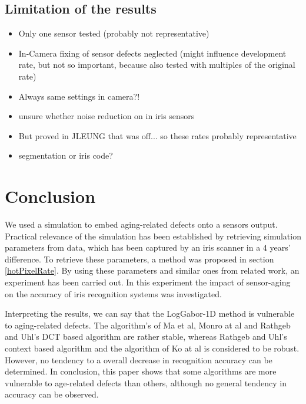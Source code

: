\documentclass[10pt,twocolumn,letterpaper]{article}
\begin{document}
 
 \subsection{Limitation of the results}
 \begin{itemize}
  \item Only one sensor tested (probably not representative)
  \item In-Camera fixing of sensor defects neglected (might influence development rate, but not so important, because also tested with multiples of the original rate)
  \item Always same settings in camera?!
  \item unsure whether noise reduction on in iris sensors
  \item But proved in JLEUNG that was off... so these rates probably representative
  \item segmentation or iris code?
 \end{itemize}
 
 
 \section{Conclusion}
 \label{conclusion}
 We used a simulation to embed aging-related defects onto a sensors output. Practical relevance of the simulation has been established by retrieving simulation parameters from data, which has been captured by an iris scanner in a 4 years' difference. To retrieve these parameters, a method was proposed in section \ref{hotPixelRate}. By using these parameters and similar ones from related work, an experiment has been carried out. In this experiment the impact of sensor-aging on the accuracy of iris recognition systems was investigated.
 
 Interpreting the results, we can say that the LogGabor-1D method is vulnerable to aging-related defects. The algorithm's of Ma et al, Monro at al and Rathgeb and Uhl's DCT based algorithm are rather stable, whereas Rathgeb and Uhl's context based algorithm and the algorithm of Ko at al is considered to be robust. However, no tendency to a overall decrease in recognition accuracy can be determined. 
 In conclusion, this paper shows that some algorithms are more vulnerable to age-related defects than others, although no general tendency in accuracy can be observed. 
 




{\small


}

\end{document}
